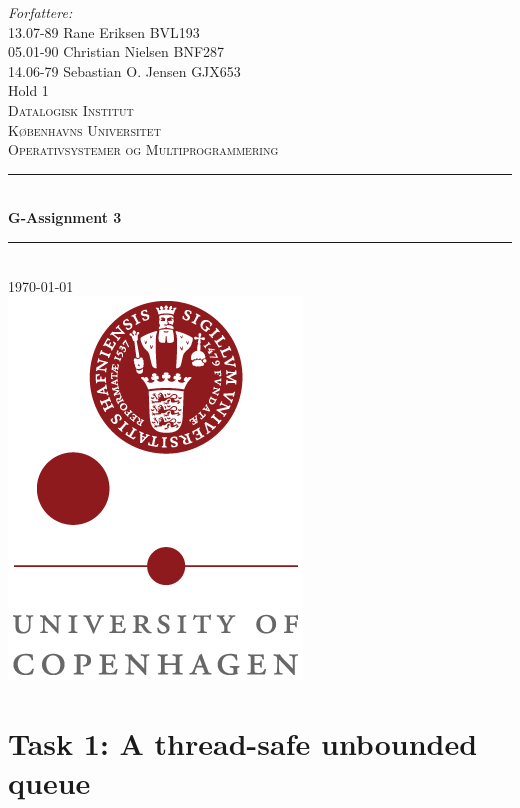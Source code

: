\documentclass[a4paper,12pt,danish]{report}
\begin{document}
\begin{titlepage}

\newcommand{\HRule}{\rule{\linewidth}{0.4mm}}
\center
\small{ \emph{Forfattere:}\\
13.07-89 Rane Eriksen \textsc{BVL193}
\\
05.01-90 Christian Nielsen \textsc{BNF287}
\\
14.06-79 Sebastian O. Jensen \textsc{GJX653}
\\
Hold 1} \\[2cm]

\textsc{\LARGE Datalogisk Institut}\\[0.5cm]
\textsc{\large Københavns Universitet}\\[1.5cm]
\textsc{\large Operativsystemer og Multiprogrammering}\\
\HRule \\[0.7cm]
{\huge \bfseries G-Assignment 3}\\[0.4cm]
\HRule \\[1.5cm]
\textsc{\Large \textsc{\today}}\\[0.5cm]

\includegraphics[scale=0.5]{ku_logo.png}\\[1cm]

\end{titlepage}
\tableofcontents
\newpage
\renewcommand{\thesection}{\arabic{section}}
\renewcommand{\thempfootnote}{\arabic{mpfootnote}}
\renewcommand\thesubsection{}
\newcommand{\minus}[1]{{#1}^{-}}
\section{Task 1: A thread-safe unbounded queue}
\end{document}
